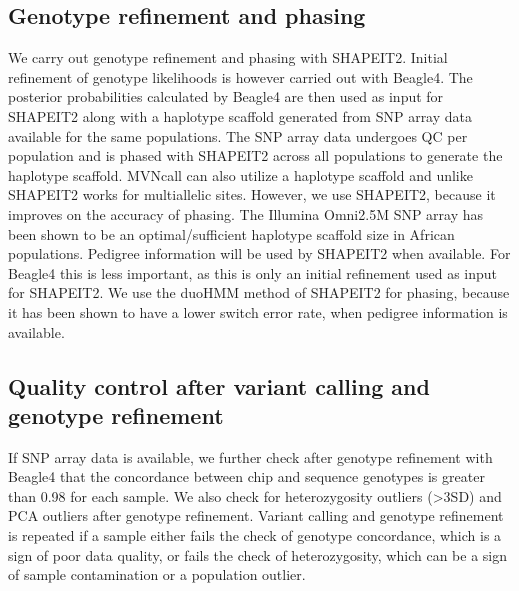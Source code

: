 \subsection{Genotype refinement and phasing}
We carry out genotype refinement and phasing with SHAPEIT2.\cite{Delaneau2012} Initial refinement of genotype likelihoods is however carried out with Beagle4.\cite{Browning20071084} The posterior probabilities calculated by Beagle4 are then used as input for SHAPEIT2 along with a haplotype scaffold generated from SNP array data available for the same populations. The SNP array data undergoes QC per population and is phased with SHAPEIT2 across all populations to generate the haplotype scaffold. MVNcall can also utilize a haplotype scaffold and unlike SHAPEIT2 works for multiallelic sites.\cite{Menelaou2013} However, we use SHAPEIT2, because it improves on the accuracy of phasing.\cite{2014Delaneau} The Illumina Omni2.5M SNP array has been shown to be an optimal/sufficient haplotype scaffold size in African populations.\cite{Menelaou2013}\cite{2014Delaneau} Pedigree information will be used by SHAPEIT2 when available. For Beagle4 this is less important, as this is only an initial refinement used as input for SHAPEIT2. We use the duoHMM method of SHAPEIT2 for phasing, because it has been shown to have a lower switch error rate, when pedigree information is available.\cite{OConnell2014}

\subsection{Quality control after variant calling and genotype refinement}
If SNP array data is available, we further check after genotype refinement with Beagle4 that the concordance between chip and sequence genotypes is greater than 0.98 for each sample. We also check for heterozygosity outliers (\textgreater3SD) and PCA outliers after genotype refinement. Variant calling and genotype refinement is repeated if a sample either fails the check of genotype concordance, which is a sign of poor data quality, or fails the check of heterozygosity, which can be a sign of sample contamination or a population outlier.